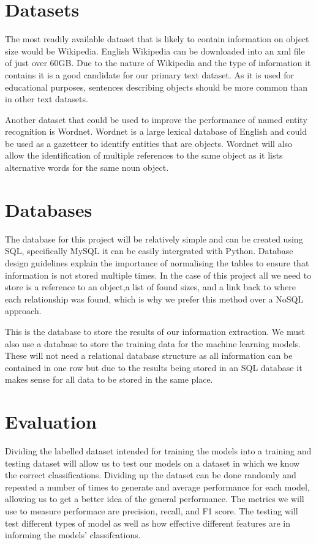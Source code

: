 \documentclass[11pt,oneside]{book}
\begin{document}
\section{Datasets}
The most readily available dataset that is likely to contain information on object size would be Wikipedia. English Wikipedia can be downloaded into an xml file of just over 60GB. Due to the nature of Wikipedia and the type of information it contains it is a good candidate for our primary text dataset. As it is used for educational purposes, sentences describing objects should be more common than in other text datasets.

Another dataset that could be used to improve the performance of named entity recognition is Wordnet. Wordnet is a large lexical database of English and could be used as a gazetteer to identify entities that are objects. Wordnet will also allow the identification of multiple references to the same object as it lists alternative words for the same noun object.

\section{Databases}
The database for this project will be relatively simple and can be created using SQL, specifically MySQL it can be easily intergrated with Python. Database design guidelines explain the importance of normalising the tables to ensure that information is not stored multiple times. In the case of this project all we need to store is a reference to an object,a list of found sizes, and a link back to where each relationship was found, which is why we prefer this method over a NoSQL approach.

This is the database to store the results of our information extraction. We must also use a database to store the training data for the machine learning models. These will not need a relational database structure as all information can be contained in one row but due to the results being stored in an SQL database it makes sense for all data to be stored in the same place.

\section{Evaluation}
Dividing the labelled dataset intended for training the models into a training and testing dataset will allow us to test our models on a dataset in which we know the correct classifications. Dividing up the dataset can be done randomly and repeated a number of times to generate and average performance for each model, allowing us to get a better idea of the general performance. The metrics we will use to measure performace are precision, recall, and F1 score. The testing will test different types of model as well as how effective different features are in informing the models' classifcations.
\end{document}
